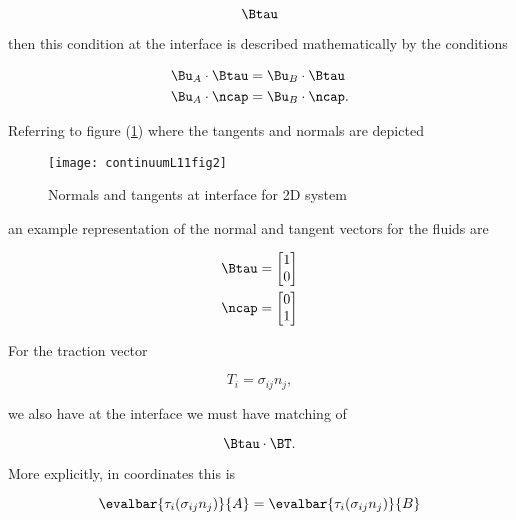 \begin{equation}\label{eqn:continuumL11:50}
\Btau
\end{equation}

then this condition at the interface is described mathematically by the conditions

\begin{align}\label{eqn:continuumL11:70}
\Bu_A \cdot \Btau &= \Bu_B \cdot \Btau \\
\Bu_A \cdot \ncap &= \Bu_B \cdot \ncap.
\end{align}

Referring to figure (\ref{fig:continuumL11:continuumL11fig2}) where the tangents and normals are depicted

\begin{figure}[htp]
   \centering
   \texttt{[image: continuumL11fig2]}
   \caption{Normals and tangents at interface for 2D system}\label{fig:continuumL11:continuumL11fig2}
\end{figure}

an example representation of the normal and tangent vectors for the fluids are

\begin{align}\label{eqn:continuumL11:90}
\Btau &= 
\begin{bmatrix}
1 \\
0
\end{bmatrix} \\
\ncap &= 
\begin{bmatrix}
0 \\
1
\end{bmatrix} 
\end{align}

For the traction vector

\begin{equation}\label{eqn:continuumL11:110}
T_i = \sigma_{ij} n_j,
\end{equation}

we also have at the interface we must have matching of

\begin{equation}\label{eqn:continuumL11:130}
\Btau \cdot \BT.
\end{equation}

More explicitly, in coordinates this is

\begin{equation}\label{eqn:continuumL11:150}
\evalbar{\tau_i (\sigma_{ij} n_j)}{A} =
\evalbar{\tau_i (\sigma_{ij} n_j)}{B}
\end{equation}

